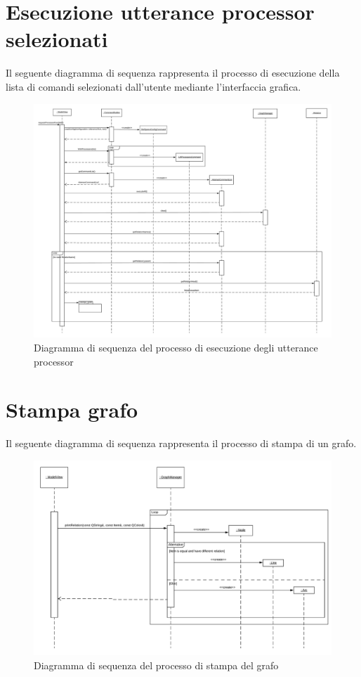 \documentclass[openany,12pt,a4paper]{report}
\begin{document}
	\section{Esecuzione utterance processor \\ selezionati}
	
	Il seguente diagramma di sequenza rappresenta il processo di esecuzione della lista di comandi selezionati dall'utente mediante l'interfaccia grafica.
	
	\begin{figure}[H]
		\includegraphics[scale=0.37]{EsecuzioneProcessor}
		\centering
		\caption{Diagramma di sequenza del processo di esecuzione degli utterance processor}
	\end{figure}
	
	\section{Stampa grafo}
	
	Il seguente diagramma di sequenza rappresenta il processo di stampa di un grafo.
	
	\begin{figure}[H]
		\includegraphics[scale=0.6]{StampaGrafo}
		\centering
		\caption{Diagramma di sequenza del processo di stampa del grafo}
	\end{figure}
	
\end{document}
